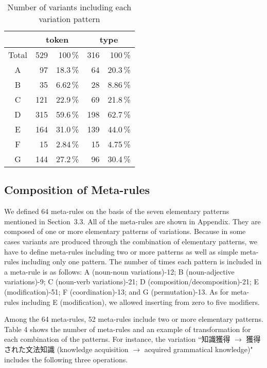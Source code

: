 \begin{table*}[htb]
\begin{center}
\begin{tabular}{c|rr|rr}
\hline
& \multicolumn{2}{|c}{token} & \multicolumn{2}{|c}{type}\\
\hline
\hline
Total & 529 & 100\,\% & 316 & 100\,\%\\
\hline
A & 97 & 18.3\,\% & 64 & 20.3\,\%\\
B & 35 & 6.62\,\% & 28 & 8.86\,\%\\
C & 121 & 22.9\,\% & 69 & 21.8\,\%\\
D & 315 & 59.6\,\% & 198 & 62.7\,\%\\
E & 164 & 31.0\,\% & 139 & 44.0\,\%\\
F & 15 & 2.84\,\% & 15 & 4.75\,\%\\
G & 144 & 27.2\,\% & 96 & 30.4\,\%\\
\hline
\end{tabular}
\end{center}
\caption{Number of variants including each variation pattern}
\end{table*}

\subsection{Composition of Meta-rules}

We defined 64 meta-rules on the basis of the seven elementary patterns mentioned in Section~3.3. All of the meta-rules are shown in Appendix. They are composed of one or more elementary patterns of variations. Because in some cases variants are produced through the combination of elementary patterns, we have to define meta-rules including two or more patterns as well as simple meta-rules including only one pattern. The number of times each pattern is included in a meta-rule is as follows: A (noun-noun variations)-12; B (noun-adjective variations)-9; C (noun-verb variations)-21; D (composition/decomposition)-21; E (modification)-51; F (coordination)-13; and G (permutation)-13. As for meta-rules including E (modification), we allowed inserting from zero to five modifiers.

Among the 64 meta-rules, 52 meta-rules include two or more elementary patterns. Table 4 shows the number of meta-rules and an example of transformation for each combination of the patterns. For instance, the variation ``知識獲得 $\rightarrow$ 獲得された文法知識 (knowledge acquisition $\rightarrow$ acquired grammatical knowledge)" includes the following three operations.

